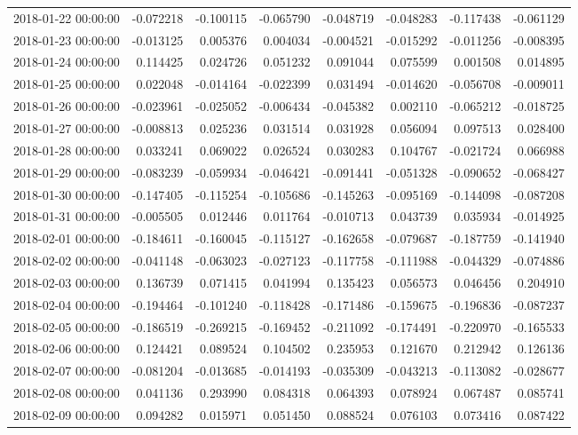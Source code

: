 \begin{tabular}{lrrrrrrr}
2018-01-22 00:00:00 & -0.072218 & -0.100115 & -0.065790 & -0.048719 & -0.048283 & -0.117438 & -0.061129 \\
2018-01-23 00:00:00 & -0.013125 & 0.005376 & 0.004034 & -0.004521 & -0.015292 & -0.011256 & -0.008395 \\
2018-01-24 00:00:00 & 0.114425 & 0.024726 & 0.051232 & 0.091044 & 0.075599 & 0.001508 & 0.014895 \\
2018-01-25 00:00:00 & 0.022048 & -0.014164 & -0.022399 & 0.031494 & -0.014620 & -0.056708 & -0.009011 \\
2018-01-26 00:00:00 & -0.023961 & -0.025052 & -0.006434 & -0.045382 & 0.002110 & -0.065212 & -0.018725 \\
2018-01-27 00:00:00 & -0.008813 & 0.025236 & 0.031514 & 0.031928 & 0.056094 & 0.097513 & 0.028400 \\
2018-01-28 00:00:00 & 0.033241 & 0.069022 & 0.026524 & 0.030283 & 0.104767 & -0.021724 & 0.066988 \\
2018-01-29 00:00:00 & -0.083239 & -0.059934 & -0.046421 & -0.091441 & -0.051328 & -0.090652 & -0.068427 \\
2018-01-30 00:00:00 & -0.147405 & -0.115254 & -0.105686 & -0.145263 & -0.095169 & -0.144098 & -0.087208 \\
2018-01-31 00:00:00 & -0.005505 & 0.012446 & 0.011764 & -0.010713 & 0.043739 & 0.035934 & -0.014925 \\
2018-02-01 00:00:00 & -0.184611 & -0.160045 & -0.115127 & -0.162658 & -0.079687 & -0.187759 & -0.141940 \\
2018-02-02 00:00:00 & -0.041148 & -0.063023 & -0.027123 & -0.117758 & -0.111988 & -0.044329 & -0.074886 \\
2018-02-03 00:00:00 & 0.136739 & 0.071415 & 0.041994 & 0.135423 & 0.056573 & 0.046456 & 0.204910 \\
2018-02-04 00:00:00 & -0.194464 & -0.101240 & -0.118428 & -0.171486 & -0.159675 & -0.196836 & -0.087237 \\
2018-02-05 00:00:00 & -0.186519 & -0.269215 & -0.169452 & -0.211092 & -0.174491 & -0.220970 & -0.165533 \\
2018-02-06 00:00:00 & 0.124421 & 0.089524 & 0.104502 & 0.235953 & 0.121670 & 0.212942 & 0.126136 \\
2018-02-07 00:00:00 & -0.081204 & -0.013685 & -0.014193 & -0.035309 & -0.043213 & -0.113082 & -0.028677 \\
2018-02-08 00:00:00 & 0.041136 & 0.293990 & 0.084318 & 0.064393 & 0.078924 & 0.067487 & 0.085741 \\
2018-02-09 00:00:00 & 0.094282 & 0.015971 & 0.051450 & 0.088524 & 0.076103 & 0.073416 & 0.087422 \\

\end{tabular}
